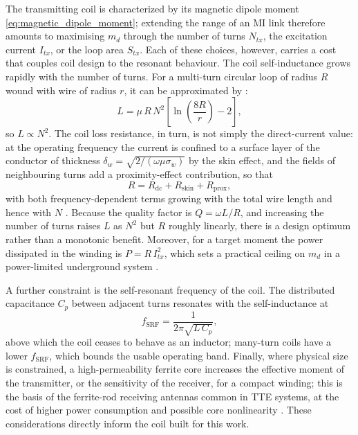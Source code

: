 The transmitting coil is characterized by its magnetic dipole moment
\ref{eq:magnetic_dipole_moment}; extending the range of an
MI link therefore amounts to maximising $m_d$ through the number of turns
$N_{tx}$, the excitation current $I_{tx}$, or the loop area $S_{tx}$. Each of these
choices, however, carries a cost that couples coil design to the resonant
behaviour.
\newp
The coil self-inductance grows rapidly with the number of turns. For a multi-turn
circular loop of radius $R$ wound with wire of radius $r$, it can be
approximated by \cite{utfsm}:
\begin{equation}
    L = \mu\, R\, N^{2}\left[\ln\!\left(\frac{8R}{r}\right) - 2\right],
    \label{eq:coil_inductance}
\end{equation}
so $L \propto N^{2}$. The coil loss resistance, in turn, is not simply the
direct-current value: at the operating frequency the current is confined to a
surface layer of the conductor of thickness
$\delta_w = \sqrt{2/(\omega\mu\sigma_{w})}$ by the skin effect, and the fields of
neighbouring turns add a proximity-effect contribution, so that
\begin{equation}
    R = R_{\mathrm{dc}} + R_{\mathrm{skin}} + R_{\mathrm{prox}},
    \label{eq:coil_resistance}
\end{equation}
with both frequency-dependent terms growing with the total wire length and hence
with $N$ \cite{9205830}. Because the quality factor is
$Q = \omega L / R$, and increasing the number of
turns raises $L$ as $N^{2}$ but $R$ roughly linearly, there is a design optimum
rather than a monotonic benefit. Moreover, for a target moment the power
dissipated in the winding is $P = R\,I_{tx}^{2}$, which sets a practical ceiling
on $m_d$ in a power-limited underground system \cite{carreno2016through}.

A further constraint is the self-resonant frequency of the coil. The distributed
capacitance $C_p$ between adjacent turns resonates with the self-inductance at
\begin{equation}
    f_{\mathrm{SRF}} = \frac{1}{2\pi\sqrt{L\,C_p}},
    \label{eq:srf}
\end{equation}
above which the coil ceases to behave as an inductor; many-turn coils have a lower
$f_{\mathrm{SRF}}$, which bounds the usable operating band. Finally, where physical
size is constrained, a high-permeability ferrite core increases the effective
moment of the transmitter, or the sensitivity of the receiver, for a compact
winding; this is the basis of the ferrite-rod receiving antennas common in TTE
systems, at the cost of higher power consumption and possible core
nonlinearity \cite{carreno2016through, agbinya2022principles}. These considerations directly inform the coil built for this work.

